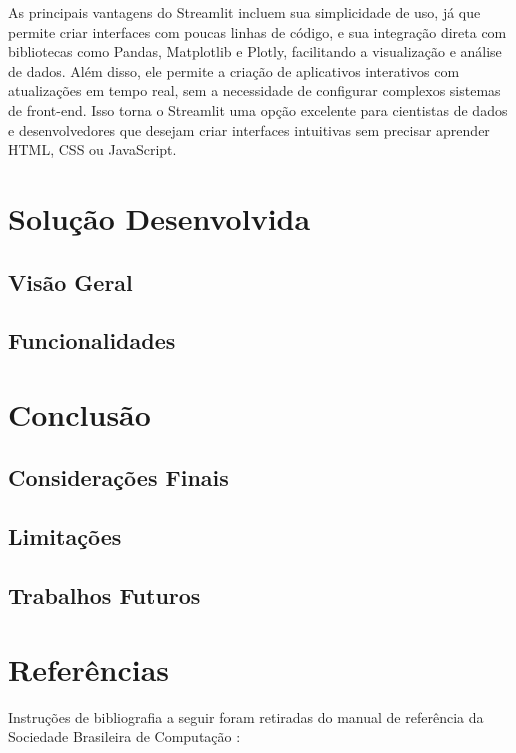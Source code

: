 \documentclass[a4paper, 12pt]{article}
\newcommand{\citeb}[1]{\bibleftbracket\cite{#1}\bibrightbracket}
\begin{document}
    As principais vantagens do Streamlit incluem sua simplicidade de uso, já que permite criar interfaces com poucas linhas de código, e sua integração direta com bibliotecas como Pandas, Matplotlib e Plotly, facilitando a visualização e análise de dados. Além disso, ele permite a criação de aplicativos interativos com atualizações em tempo real, sem a necessidade de configurar complexos sistemas de front-end. Isso torna o Streamlit uma opção excelente para cientistas de dados e desenvolvedores que desejam criar interfaces intuitivas sem precisar aprender HTML, CSS ou JavaScript.

    \clearpage

    \section{Solução Desenvolvida}
    \subsection{Visão Geral}
    \lipsum[1-2]
    \subsection{Funcionalidades}
    \lipsum[3-4]

    \clearpage

    \section{Conclusão}
    \subsection{Considerações Finais}
    \lipsum[1-2]
    \subsection{Limitações}
    \lipsum[3-4]
    \subsection{Trabalhos Futuros}
    \lipsum[5-6]

    \clearpage

    \section*{Referências}
    Instruções de bibliografia a seguir foram retiradas do manual de referência
    da Sociedade Brasileira de Computação \citeb{sbc}:
\end{document}
